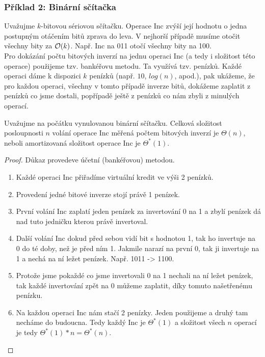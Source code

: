 \newpage

\subsubsection{Příklad 2: Binární sčítačka}

Uvažujme $k$-bitovou sériovou sčítačku. Operace Inc zvýší její hodnotu o jedna postupným otáčením bitů zprava do leva. V nejhorší případě musíme otočit všechny bity za $\mathcal{O}(k)$. Např. Inc na 011 otočí všechny bity na 100. \\

\noindent Pro dokázání počtu bitových inverzí na jednu operaci Inc (a tedy i složitost této operace) použijeme tzv. bankéřovu metodu. Ta využívá tzv. penízků. Každé operaci dáme k dispozici $k$ penízků (např. $10$, $log(n)$, apod.), pak ukážeme, že pro každou operaci, všechny v tomto případě inverze bitů, dokážeme zaplatit z penízků co jsme dostali, popřípadě ještě z penízků co nám zbyli z minulých operací.

\begin{theorem}
  Uvažujme na počátku vynulovanou binární sčítačku. Celková složitost posloupnosti $n$ volání operace $\text{Inc}$ měřená počtem bitových inverzí je $\Theta(n)$, neboli amortizovaná složitost operace $\text{Inc}$ je $\Theta^{*}(1)$.
\end{theorem}

\begin{proof}
Důkaz provedeve účetní (bankéřovou) metodou.
\begin{enumerate}
    \item Každé operaci Inc přiřadíme virtuální kredit ve výši 2 penízků.
    \item Provedení jedné bitové inverze stojí právě 1 penízek.
    \item První volání Inc zaplatí jeden penízek za invertování 0 na 1 a zbylí penízek dá nad tuto jedničku kterou právě invertoval.
    \item Další volání Inc dokud před sebou vidí bit s hodnotou 1, tak ho invertuje na 0 do té doby, než je před ním 1. Jakmile narazí na první 0, tak ji invertuje na 1 a nechá na ní ležet penízek. Např. 1011 -> 1100.
    \item Protože jsme pokaždé co jsme invertovali 0 na 1 nechali na ní ležet penízek, tak každé invertování zpět na 0 můžeme zaplatit, díky tomuto našetřenému penízku.
    \item Na každou operaci $\text{Inc}$ nám stačí 2 penízky. Jeden použijeme a druhý tam necháme do budoucna. Tedy každý $\text{Inc}$ je $\Theta^{*}(1)$ a složitost všech $n$ operací je tedy $\Theta^{*}(1) * n = \Theta^{*}(n)$.
\end{enumerate}
\end{proof}
